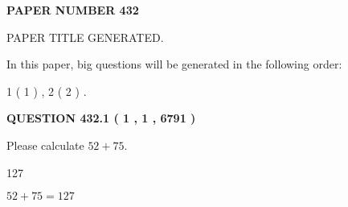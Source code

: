 \documentclass[12pt]{article}
\begin{document}
   
   
   
\newpage 
\setcounter{page}{ 
   432001 } 
   
   
   
   
 {\textbf{ \Large{ PAPER NUMBER  432  }}}
   
   
\vspace{0.2in}
   
   
   
   
   
   
   
   
 \vspace{0.2in}
 
 
 
 
   
   
 PAPER TITLE GENERATED.
   
   
   
\vspace{0.2in}
   
In this paper, big questions will be generated in the following order: 
   
   
   1 ( 1 )
 ,
   2 ( 2 )
 .
  
\vspace{0.2in}
  
{\textbf{\Large{QUESTION
432.1 
 ( 1 , 1 , 6791 )
}}}
  
  
 
Please calculate $ %
52 +  %
75 $.
 
 
 
\noindent{}
 
 

127
 
 
\noindent{}
 
 

 
 
 
\noindent{}
 
 

$ %
52 +  %
75=   %
127$
 
 
\noindent{}
 
 

 
   
   
   
\end{document}
